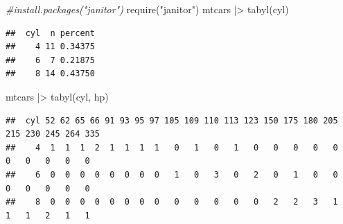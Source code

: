 \documentclass[
  12pt,
  oneside]{book}
\newenvironment{Shaded}{\begin{snugshade}}{\end{snugshade}}
\newcommand{\CommentTok}[1]{\textcolor[rgb]{0.56,0.35,0.01}{\textit{#1}}}
\newcommand{\FunctionTok}[1]{\textcolor[rgb]{0.00,0.00,0.00}{#1}}
\newcommand{\NormalTok}[1]{#1}
\newcommand{\SpecialCharTok}[1]{\textcolor[rgb]{0.00,0.00,0.00}{#1}}
\newcommand{\StringTok}[1]{\textcolor[rgb]{0.31,0.60,0.02}{#1}}
\theoremstyle{definition}
\theoremstyle{definition}
\theoremstyle{definition}
\theoremstyle{definition}
\theoremstyle{remark}
\begin{document}
\begin{Shaded}
\begin{Highlighting}[]
\CommentTok{\#install.packages("janitor")}
\FunctionTok{require}\NormalTok{(}\StringTok{"janitor"}\NormalTok{)}
\NormalTok{mtcars }\SpecialCharTok{|\textgreater{}} 
  \FunctionTok{tabyl}\NormalTok{(cyl) }
\end{Highlighting}
\end{Shaded}

\begin{verbatim}
##  cyl  n percent
##    4 11 0.34375
##    6  7 0.21875
##    8 14 0.43750
\end{verbatim}

\begin{Shaded}
\begin{Highlighting}[]
\NormalTok{mtcars }\SpecialCharTok{|\textgreater{}} 
  \FunctionTok{tabyl}\NormalTok{(cyl, hp) }
\end{Highlighting}
\end{Shaded}

\begin{verbatim}
##  cyl 52 62 65 66 91 93 95 97 105 109 110 113 123 150 175 180 205 215 230 245 264 335
##    4  1  1  1  2  1  1  1  1   0   1   0   1   0   0   0   0   0   0   0   0   0   0
##    6  0  0  0  0  0  0  0  0   1   0   3   0   2   0   1   0   0   0   0   0   0   0
##    8  0  0  0  0  0  0  0  0   0   0   0   0   0   2   2   3   1   1   1   2   1   1
\end{verbatim}
\end{document}
